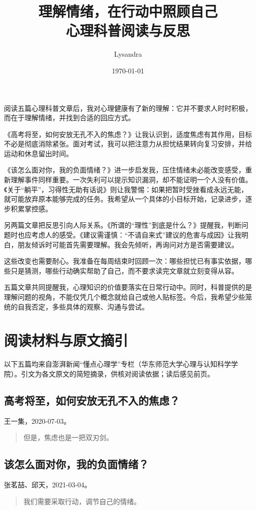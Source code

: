 \documentclass[UTF8,a4paper,zihao=-4,fontset=fandol]{ctexart}
\title{理解情绪，在行动中照顾自己\\[0.4em]\large 心理科普阅读与反思}
\author{\kaishu Lysandra}
\date{\today}
\begin{document}
\maketitle
\vspace{-2.5em}
阅读五篇心理科普文章后，我对心理健康有了新的理解：它并不要求人时时积极，而在于理解情绪，并找到合适的回应方式。

《高考将至，如何安放无孔不入的焦虑？》让我认识到，适度焦虑有其作用，目标不必是彻底消除紧张。面对考试，我可以把注意力从担忧结果转向复习安排，并给运动和休息留出时间。\cite{anxiety}

《该怎么面对你，我的负面情绪？》进一步启发我，压住情绪未必能改变感受，重新理解事件同样重要。一次失利可以提示知识漏洞，却不能证明一个人没有价值。\cite{emotion}《关于“躺平”，习得性无助有话说》则让我警惕：如果把暂时受挫看成永远无能，就可能放弃原本能够完成的任务。我希望从一个具体的小目标开始，记录进步，逐步积累掌控感。\cite{helpless}

另两篇文章把反思引向人际关系。《所谓的“理性”到底是什么？》提醒我，判断问题时也应考虑人的感受。\cite{reason}《建议需谨慎：“不请自来式”建议的危害与成因》让我明白，朋友倾诉时可能首先需要理解。我会先倾听，再询问对方是否需要建议。\cite{advice}

这些改变也需要耐心。我准备在每周结束时回顾一次：哪些担忧已有事实依据，哪些只是猜测，哪些行动确实帮助了自己，而不要求读完文章就立刻变得从容。

五篇文章共同提醒我，心理知识的价值要落实在日常行动中。同时，科普提供的是理解问题的视角，不能仅凭几个概念就给自己或他人贴标签。今后，我希望少些笼统的自我否定，多些具体的观察、沟通与尝试。

\clearpage
\section*{阅读材料与原文摘引}
以下五篇均来自澎湃新闻“懂点心理学”专栏（华东师范大学心理与认知科学学院）。引文为各文原文的简短摘录，供核对阅读依据；读后感见前页。
\subsection*{高考将至，如何安放无孔不入的焦虑？}
王一集，2020-07-03。\cite{anxiety}
\begin{quote}
但是，焦虑也是一把双刃剑。
\end{quote}
\subsection*{该怎么面对你，我的负面情绪？}
张茗{喆}、邱天，2021-03-04。\cite{emotion}
\begin{quote}
我们需要采取行动，调节自己的情绪。
\end{quote}
\end{document}
